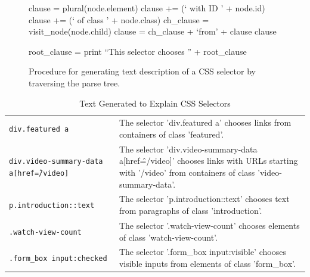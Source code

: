 \begin{figure}
\begin{algorithmic}

    \State clause = plural(node.element)
        \State clause += (` with ID ' + node.id)
        \State clause += (` of class ' + node.class)
    \EndIf
        \State ch\_clause = visit\_node(node.child)
        \State clause = ch\_clause + `from' + clause
    \EndIf
    \State \Return clause
\EndFunction

\State
{}
    \State root\_clause = 
    \State print ``This selector chooses '' + root\_clause
\EndFunction

\end{algorithmic}
\caption{Procedure for generating text description of a CSS selector by traversing the parse tree.}
\label{alg:css_traversal}
\end{figure}


\begin{table}[t]
\caption{Text Generated to Explain CSS Selectors}
\label{tab:css_descriptions}
\centering
\begin{tabular}{|S|T|}
\hline
{} &  \\
\hline
\texttt{div.featured a} & The selector 'div.featured a' chooses links from containers of class 'featured'. \\ \hline
\texttt{div.video-summary-data a[href\^=/video]} & The selector 'div.video-summary-data a[href\^=/video]' chooses links with URLs starting with '/video' from containers of class 'video-summary-data'. \\ \hline
\texttt{p.introduction::text} & The selector 'p.introduction::text' chooses text from paragraphs of class 'introduction'. \\ \hline
\texttt{.watch-view-count} & The selector '.watch-view-count' chooses elements of class 'watch-view-count'. \\ \hline
\texttt{.form\_box input:checked} & The selector '.form\_box input:visible' chooses visible inputs from elements of class 'form\_box'. \\ \hline
\end{tabular}
\end{table}

